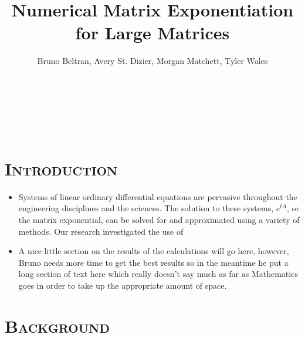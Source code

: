 \documentclass[landscape, a0]{sciposter}
\title{Numerical Matrix Exponentiation for Large Matrices}
\author{Bruno Beltran, Avery St. Dizier, Morgan Matchett, Tyler Wales}
\institute{Department of Mathematics \\
             Louisiana State University }
\begin{document}


\\
\\
\\
  \begin{multicols}{4}

  \section*{\textsc{Introduction}}
\begin{itemize}
      \item Systems of linear ordinary differential equations are pervasive throughout the engineering disciplines and the sciences.  The solution to these systems, $e^{tA}$, or the matrix exponential, can be solved for and approximated using a variety of methods.  Our research investigated the use of 
     \item A nice little section on the results of the calculations will go here, however, Bruno needs more time to get the best results so in the meantime he put a long section of text here which really doesn't say much as far as Mathematics goes in order to take up the appropriate amount of space.
\end{itemize}
%
%
\section{\textsc{Background}}
%

\end{multicols}
\end{document}
